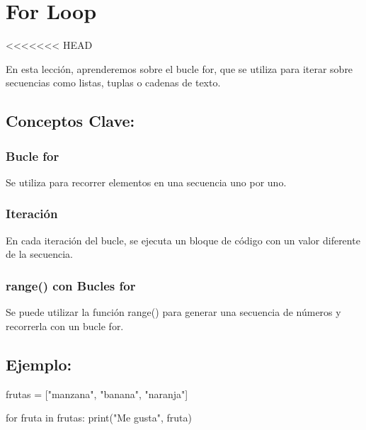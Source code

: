\documentclass[
  a4paper,
  DIV=11,
  numbers=noendperiod,
  onepage,
  openany]{scrreprt}
\newenvironment{Shaded}{\begin{snugshade}}{\end{snugshade}}
\newcommand{\BuiltInTok}[1]{\textcolor[rgb]{0.00,0.23,0.31}{#1}}
\newcommand{\ControlFlowTok}[1]{\textcolor[rgb]{0.00,0.23,0.31}{#1}}
\newcommand{\KeywordTok}[1]{\textcolor[rgb]{0.00,0.23,0.31}{#1}}
\newcommand{\NormalTok}[1]{\textcolor[rgb]{0.00,0.23,0.31}{#1}}
\newcommand{\OperatorTok}[1]{\textcolor[rgb]{0.37,0.37,0.37}{#1}}
\newcommand{\StringTok}[1]{\textcolor[rgb]{0.13,0.47,0.30}{#1}}
\begin{document}
\hypertarget{for-loop}{%
\chapter{For Loop}\label{for-loop}}

\textless\textless\textless\textless\textless\textless\textless{} HEAD

En esta lección, aprenderemos sobre el bucle for, que se utiliza para
iterar sobre secuencias como listas, tuplas o cadenas de texto.

\hypertarget{conceptos-clave-42}{%
\section{Conceptos Clave:}\label{conceptos-clave-42}}

\hypertarget{bucle-for}{%
\subsection{Bucle for}\label{bucle-for}}

Se utiliza para recorrer elementos en una secuencia uno por uno.

\hypertarget{iteraciuxf3n}{%
\subsection{Iteración}\label{iteraciuxf3n}}

En cada iteración del bucle, se ejecuta un bloque de código con un valor
diferente de la secuencia.

\hypertarget{range-con-bucles-for}{%
\subsection{range() con Bucles for}\label{range-con-bucles-for}}

Se puede utilizar la función range() para generar una secuencia de
números y recorrerla con un bucle for.

\hypertarget{ejemplo-42}{%
\section{Ejemplo:}\label{ejemplo-42}}

\begin{Shaded}
\begin{Highlighting}[]
\NormalTok{frutas }\OperatorTok{=}\NormalTok{ [}\StringTok{"manzana"}\NormalTok{, }\StringTok{"banana"}\NormalTok{, }\StringTok{"naranja"}\NormalTok{]}

\ControlFlowTok{for}\NormalTok{ fruta }\KeywordTok{in}\NormalTok{ frutas:}
    \BuiltInTok{print}\NormalTok{(}\StringTok{"Me gusta"}\NormalTok{, fruta)}
\end{Highlighting}
\end{Shaded}
\end{document}

